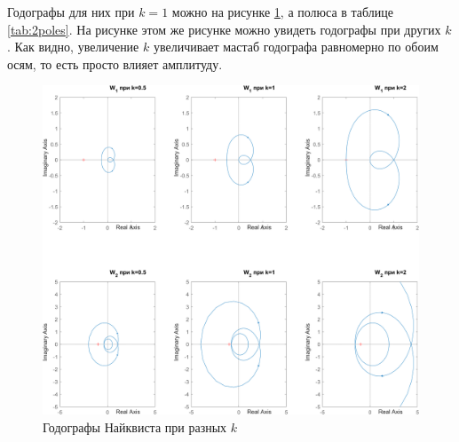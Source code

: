 Годографы для них при $k=1$ можно на рисунке \ref{fig:W12_nyquist},
а полюса в таблице \ref{tab:2poles}.
На рисунке этом же рисунке можно увидеть годографы при других $k$. Как видно,
увеличение $k$ увеличивает мастаб годографа равномерно по обоим осям,
то есть просто влияет амплитуду.


\begin{figure}[H]
    \centering
    \includegraphics[width=\textwidth]{figs/task_2_ks_nyaquist.png}
    \caption{Годографы Найквиста при разных $k$}
    \label{fig:W12_nyquist}
\end{figure}

